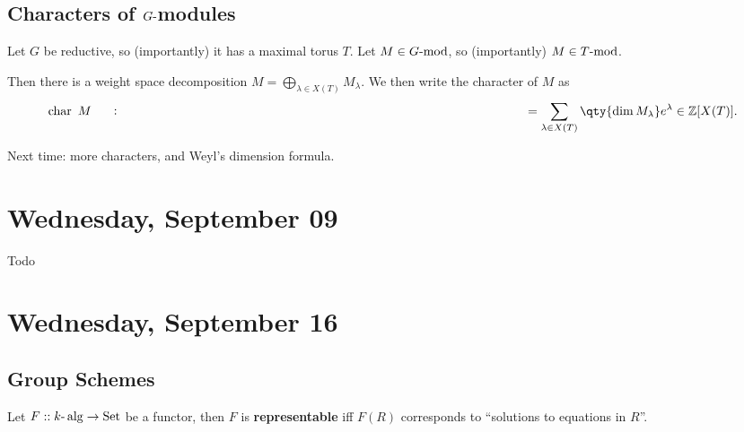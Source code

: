 \hypertarget{characters-of-ghbox-modules}{%
\subsection{\texorpdfstring{Characters of
\(G{\hbox{-}}\)modules}{Characters of G\{\textbackslash hbox\{-\}\}modules}}\label{characters-of-ghbox-modules}}

Let \(G\) be reductive, so (importantly) it has a maximal torus \(T\).
Let \(M\in G{\hbox{-}}\mathrm{mod}\), so (importantly)
\(M\in T{\hbox{-}}\mathrm{mod}\).

Then there is a weight space decomposition
\(M = \bigoplus_{\lambda \in X(T)} M_\lambda\). We then write the
character of \(M\) as
\begin{align*}   \operatorname{char}~M \mathrel{\vcenter{:}}=\sum_{\lambda \in X(T)} \qty{\dim M_\lambda} e^{\lambda} \in {\mathbb{Z}}[X(T)] .\end{align*}

Next time: more characters, and Weyl's dimension formula.

\hypertarget{wednesday-september-09}{%
\section{Wednesday, September 09}\label{wednesday-september-09}}

Todo

\hypertarget{wednesday-september-16}{%
\section{Wednesday, September 16}\label{wednesday-september-16}}

\hypertarget{group-schemes}{%
\subsection{Group Schemes}\label{group-schemes}}

\begin{definition}

\begin{definition}

Let \(F:: k{\hbox{-}}\operatorname{alg}\to {\text{Set}}\) be a functor,
then \(F\) is \textbf{representable} iff \(F(R)\) corresponds to
``solutions to equations in \(R\)''.

\end{definition}

\end{definition}

